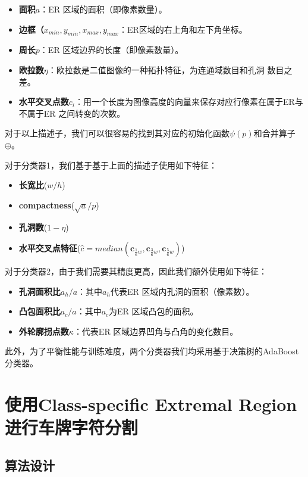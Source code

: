 \begin{itemize}
\item \textbf{面积$a$}：ER 区域的面积（即像素数量）。
\item \textbf{边框（$x_{min}, y_{min}, x_{max}, y_{max}$}：ER区域的右上角和左下角坐标。
\item \textbf{周长$p$}：ER 区域边界的长度（即像素数量）。
\item \textbf{欧拉数$\eta$}：欧拉数是二值图像的一种拓扑特征，为连通域数目和孔洞
  数目之差。
\item \textbf{水平交叉点数$c_i$}：用一个长度为图像高度的向量来保存对应行像素在属于ER与不属于ER 之间转变的次数。
\end{itemize}

对于以上描述子，我们可以很容易的找到其对应的初始化函数$\psi(p)$和合并算子
$\oplus$。

对于分类器1，我们基于基于上面的描述子使用如下特征：

\begin{itemize}
\item \textbf{长宽比}($w/h$)
\item \textbf{compactness}($\sqrt{a}/p$)
\item \textbf{孔洞数}($1-\eta$)
\item \textbf{水平交叉点特征}($\hat{c}=median(\mathbf{c}_{\frac{1}{6}w}, \mathbf{c}_{\frac{3}{6}w}, \mathbf{c}_{\frac{5}{6}w})$)
\end{itemize}

对于分类器2，由于我们需要其精度更高，因此我们额外使用如下特征：

\begin{itemize}
\item \textbf{孔洞面积比$a_h/a$}：其中$a_h$代表ER 区域内孔洞的面积（像素数）。
\item \textbf{凸包面积比$a_c/a$}：其中$a_c$为ER 区域凸包的面积。
\item \textbf{外轮廓拐点数$\kappa$}：代表ER 区域边界凹角与凸角的变化数目。
\end{itemize}

此外，为了平衡性能与训练难度，两个分类器我们均采用基于决策树的AdaBoost分类器。

\section{使用Class-specific Extremal Region进行车牌字符分割}

\subsection{算法设计}

